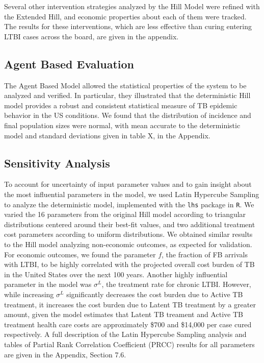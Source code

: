 \documentclass{amsart}
\begin{document}
Several other intervention strategies analyzed by the Hill Model were refined
with the Extended Hill, and economic properties about each of them were tracked.
The results for these interventions, which are less effective than curing
entering LTBI cases across the board, are given in the appendix. 
\subsection{Agent Based Evaluation}
The Agent Based Model allowed the statistical properties of the system to be
analyzed and verified. In particular, they illustrated that the deterministic
Hill model provides a robust and consistent statistical measure of TB epidemic
behavior in the US conditions. We found that the distribution of incidence and
final population sizes were normal, with mean accurate to the deterministic
model and standard deviations given in table X, in the Appendix. 

\subsection{Sensitivity Analysis}
To account for uncertainty of input parameter values and to gain insight about the
most influential parameters in the model, we used Latin Hypercube Sampling to analyze the deterministic model, implemented with the \texttt{lhs} package in \texttt{R}.  We varied 
the 16 parameters from the original Hill model according to triangular distributions centered
around their best-fit values, and two additional treatment cost parameters according to uniform distributions.  We obtained similar results to the Hill model 
analyzing non-economic outcomes, as expected for validation.  For economic 
outcomes, we found the parameter $f$, the fraction of FB arrivals with LTBI,
to be highly correlated with the projected overall cost burden of TB in the United States
over the next 100 years.  Another highly influential parameter in the model was $\sigma^{L}$, 
the treatment rate for chronic LTBI.  However, while increasing $\sigma^{L}$ significantly
decreases the cost burden due to Active TB treatment, it increases the cost burden due to Latent TB treatment by a greater amount, given the model estimates that Latent TB treament and Active
TB treatment health care costs are approximately \$700 and \$14,000 per case cured respectively.  
A full description of the Latin Hypercube Sampling analysis and tables of Partial Rank Correlation Coefficient (PRCC) results for all parameters are given in the Appendix, Section 7.6.  \\
\end{document}

